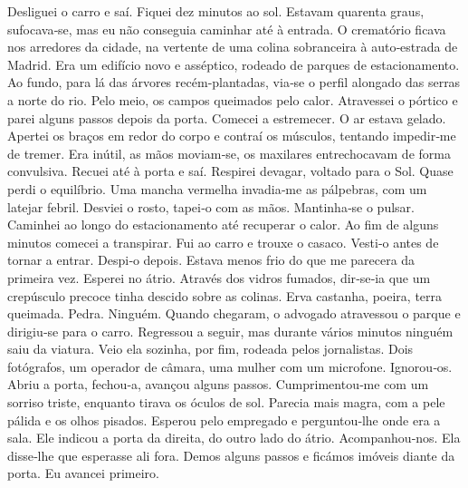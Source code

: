 Desliguei o carro e saí. Fiquei dez minutos ao sol. Estavam quarenta
graus, sufocava­‑se, mas eu não conseguia caminhar até à entrada. O
crematório ficava nos arredores da cidade, na vertente de uma colina
sobranceira à auto­‑estrada de Madrid. Era um edifício novo e asséptico,
rodeado de parques de estacionamento. Ao fundo, para lá das árvores
recém­‑plantadas, via­‑se o perfil alongado das serras a norte do rio.
Pelo meio, os campos queimados pelo calor. Atravessei o pórtico e parei
alguns passos depois da porta. Comecei a estremecer. O ar estava gelado.
Apertei os braços em redor do corpo e contraí os músculos, tentando
impedir­‑me de tremer. Era inútil, as mãos moviam­‑se, os maxilares
entrechocavam de forma convulsiva. Recuei até à porta e saí. Respirei
devagar, voltado para o Sol. Quase perdi o equilíbrio. Uma mancha
vermelha invadia­‑me as pálpebras, com um latejar febril. Desviei o
rosto, tapei­‑o com as mãos. Mantinha­‑se o pulsar. Caminhei ao longo do
estacionamento até recuperar o calor. Ao fim de alguns minutos comecei a
transpirar. Fui ao carro e trouxe o casaco. Vesti­‑o antes de tornar a
entrar. Despi­‑o depois. Estava menos frio do que me parecera da
primeira vez. Esperei no átrio. Através dos vidros fumados, dir­‑se­‑ia
que um crepúsculo precoce tinha descido sobre as colinas. Erva castanha,
poeira, terra queimada. Pedra. Ninguém. Quando chegaram, o advogado
atravessou o parque e dirigiu­‑se para o carro. Regressou a seguir, mas
durante vários minutos ninguém saiu da viatura. Veio ela sozinha, por
fim, rodeada pelos jornalistas. Dois fotógrafos, um operador de câmara,
uma mulher com um microfone. Ignorou­‑os. Abriu a porta, fechou­‑a,
avançou alguns passos. Cumprimentou­‑me com um sorriso triste, enquanto
tirava os óculos de sol. Parecia mais magra, com a pele pálida e os
olhos pisados. Esperou pelo empregado e perguntou­‑lhe onde era a sala.
Ele indicou a porta da direita, do outro lado do átrio. Acompanhou­‑nos.
Ela disse­‑lhe que esperasse ali fora. Demos alguns passos e ficámos
imóveis diante da porta. Eu avancei primeiro.

